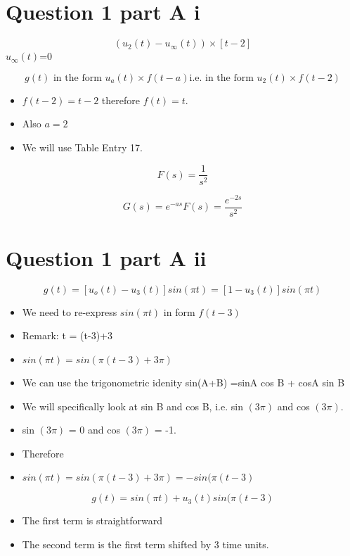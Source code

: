 \documentclass[11pt,a4paper,titlepage,oneside,openany]{article}
\numberwithin{equation}{section}
\numberwithin{algorithm}{section}
\numberwithin{figure}{section}
\numberwithin{table}{section}
\begin{document}
\section*{Question 1 part A i}
{\large

\[ (u_2(t) -  u_{\infty}(t)) \times [t-2]\]
$u_{\infty}(t)$=0

\[g(t) \mbox{ in the form }u_a(t)  \times f(t-a) \mbox{i.e. in the form } u_2(t)  \times f(t-2)\]

\begin{itemize}
\item $f(t-2) = t-2$ therefore $f(t) = t$.
\item Also $a=2$
\item We will use Table Entry 17.
\end{itemize}


\[ F(s)= \frac{1}{s^2} \]


\[ G(s)  = e^{-as}F(s)= \frac{e^{-2s}}{s^2} \]
}
\section*{Question 1 part A ii }
{ \large
\[ g(t) = \left[u_o(t) -  u_3(t)\right] sin(\pi t)=[1 - u_3(t)] sin (\pi t)\]

\begin{itemize}
\item We need to re-express $sin (\pi t)$ in form $f(t-3)$
\item Remark: t = (t-3)+3
\item $sin (\pi t) = sin (\pi(t-3)+ 3\pi) $
\item We can use the trigonometric idenity sin(A+B) =sinA cos B + cosA sin B
\item We will specifically look at sin B and cos B, i.e. sin $(3\pi)$ and cos $(3\pi)$. 
\item sin $(3\pi)$ = 0 and cos $(3\pi)$ = -1.
\item Therefore \item $sin (\pi t) = sin (\pi(t-3)+ 3\pi)  = -sin (\pi(t-3) $
\end{itemize}
\[ g(t) = sin (\pi t) + u_3(t)sin(\pi(t-3) \]
\begin{itemize}
\item The first term is straightforward
\item The second term is the first term shifted by 3 time units.
\end{itemize}
}
\end{document}
